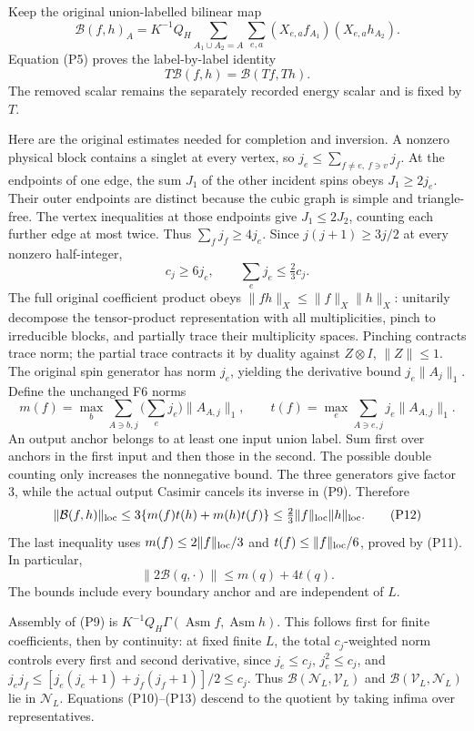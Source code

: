 \documentclass[11pt]{article}
\begin{document}
Keep the original union-labelled bilinear map
\[
 \mathcal B(f,h)_A=K^{-1}Q_H
 \sum_{A_1\cup A_2=A}\sum_{e,a}
 (X_{e,a}f_{A_1})(X_{e,a}h_{A_2}). \tag{P9}
\]
Equation (P5) proves the label-by-label identity
\[
 T\mathcal B(f,h)=\mathcal B(Tf,Th). \tag{P10}
\]
The removed scalar remains the separately recorded energy scalar and is fixed by \(T\).

Here are the original estimates needed for completion and inversion. A nonzero physical block contains a singlet at every vertex, so \(j_e\le\sum_{f\ne e,\ f\ni v}j_f\). At the endpoints of one edge, the sum \(J_1\) of the other incident spins obeys \(J_1\ge2j_e\). Their outer endpoints are distinct because the cubic graph is simple and triangle-free. The vertex inequalities at those endpoints give \(J_1\le2J_2\), counting each further edge at most twice. Thus \(\sum_fj_f\ge4j_e\). Since \(j(j+1)\ge3j/2\) at every nonzero half-integer,
\[
 c_j\ge6j_e,\qquad \sum_ej_e\le\tfrac23c_j. \tag{P11}
\]
The full original coefficient product obeys \(\|fh\|_X\le\|f\|_X\|h\|_X\): unitarily decompose the tensor-product representation with all multiplicities, pinch to irreducible blocks, and partially trace their multiplicity spaces. Pinching contracts trace norm; the partial trace contracts it by duality against \(Z\otimes I\), \(\|Z\|\le1\). The original spin generator has norm \(j_e\), yielding the derivative bound \(j_e\|A_j\|_1\). Define the unchanged F6 norms
\[
 m(f)=\max_b\sum_{A\ni b,j}\Big(\sum_ej_e\Big)\|A_{A,j}\|_1,\qquad
 t(f)=\max_e\sum_{A\ni e,j}j_e\|A_{A,j}\|_1.
\]
An output anchor belongs to at least one input union label. Sum first over anchors in the first input and then those in the second. The possible double counting only increases the nonnegative bound. The three generators give factor 3, while the actual output Casimir cancels its inverse in (P9). Therefore
\[
 \|\mathcal B(f,h)\|_{\rm loc}
 \le3\{m(f)t(h)+m(h)t(f)\}
 \le\tfrac23\|f\|_{\rm loc}\|h\|_{\rm loc}. \tag{P12}
\]
The last inequality uses \(m(f)\le2\|f\|_{\rm loc}/3\) and \(t(f)\le\|f\|_{\rm loc}/6\), proved by (P11). In particular,
\[
 \|2\mathcal B(q,\cdot)\|\le m(q)+4t(q). \tag{P13}
\]
The bounds include every boundary anchor and are independent of \(L\).

Assembly of (P9) is \(K^{-1}Q_H\Gamma(\operatorname{Asm}f,\operatorname{Asm}h)\). This follows first for finite coefficients, then by continuity: at fixed finite \(L\), the total \(c_j\)-weighted norm controls every first and second derivative, since \(j_e\le c_j\), \(j_e^2\le c_j\), and \(j_ej_f\le[j_e(j_e+1)+j_f(j_f+1)]/2\le c_j\). Thus \(\mathcal B(\mathscr N_L,\mathscr V_L)\) and \(\mathcal B(\mathscr V_L,\mathscr N_L)\) lie in \(\mathscr N_L\). Equations (P10)–(P13) descend to the quotient by taking infima over representatives.
\end{document}
